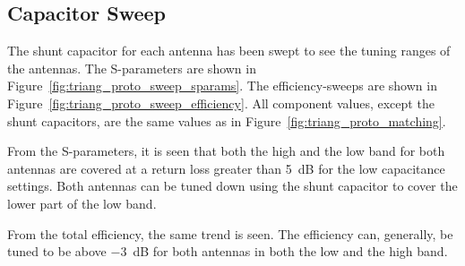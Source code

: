 \subsection{Capacitor Sweep}
The shunt capacitor for each antenna has been swept to see the tuning ranges of the antennas. The S-parameters are shown in Figure~\ref{fig:triang_proto_sweep_sparams}. The efficiency-sweeps are shown in Figure~\ref{fig:triang_proto_sweep_efficiency}. All component values, except the shunt capacitors, are the same values as in Figure~\ref{fig:triang_proto_matching}.

From the S-parameters, it is seen that both the high and the low band for both antennas are covered at a return loss greater than \SI{5}{dB} for the low capacitance settings. Both antennas can be tuned down using the shunt capacitor to cover the lower part of the low band.

From the total efficiency, the same trend is seen. The efficiency can, generally, be tuned to be above \SI{-3}{dB} for both antennas in both the low and the high band.

